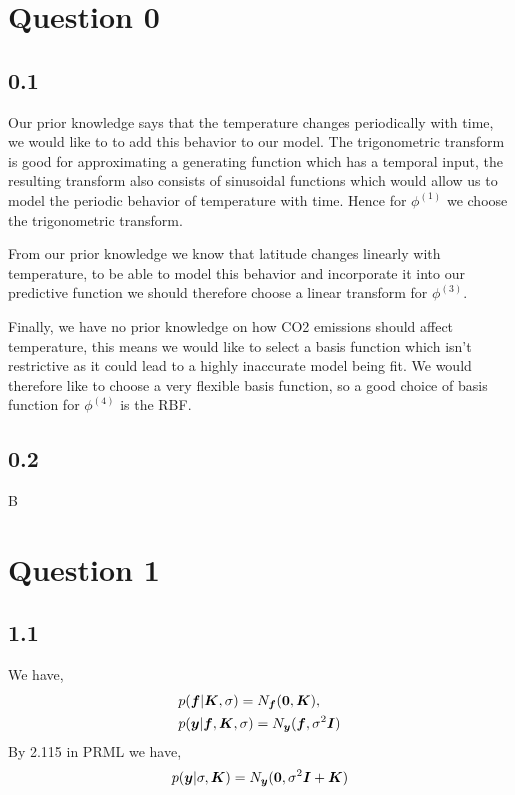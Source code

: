 \section*{Question 0}

\subsection*{0.1}
Our prior knowledge says that the temperature changes periodically with time, we would like to to add this behavior to our model. The trigonometric transform is good for approximating a generating function which has a temporal input, the resulting transform also consists of sinusoidal functions which would allow us to model the periodic behavior of temperature with time. Hence for $\phi^{(1)}$ we choose the trigonometric transform.

From our prior knowledge we know that latitude changes linearly with temperature, to be able to model this behavior and incorporate it into our predictive function we should therefore choose a linear transform for $\phi^{(3)}$. 

Finally, we have no prior knowledge on how CO2 emissions should affect temperature, this means we would like to select a basis function which isn't restrictive as it could lead to a highly inaccurate model being fit. We would therefore like to choose a very flexible basis function, so a good choice of basis function for $\phi^{(4)}$ is the RBF. 

\subsection*{0.2}
B

\section*{Question 1}

\subsection*{1.1}
We have,
\begin{align}
    &{} p({\bm{f}} | {\bm{K}} , \sigma) = N_{{\bm{f}}} (\bm{0}, {\bm{K}}), \\
    & p({\bm{y}} | {\bm{f}} , {\bm{K}}, \sigma) = N_{{\bm{y}}} ({\bm{f}}, \sigma^{2} \bm{I})
\end{align}
By 2.115 in PRML we have,
\begin{equation}
    p({\bm{y}} | \sigma, {\bm{K}}) = N_{{\bm{y}}} (\bm{0}, \sigma^{2} \bm{I} + {\bm{K}})
\end{equation}

